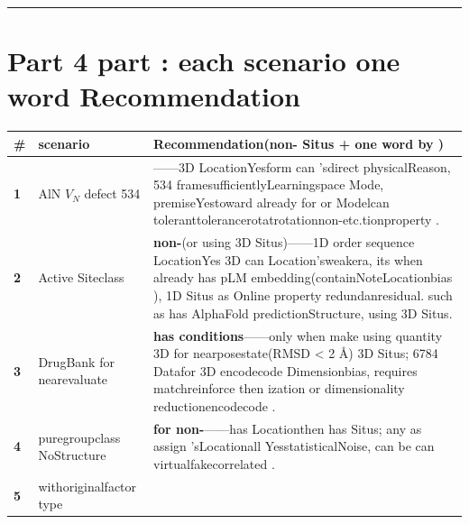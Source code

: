 \documentclass[
  12pt,
]{article}
\begin{document}
\begin{center}\rule{0.5\linewidth}{0.5pt}\end{center}

\section{Part 4
part : each scenario one word Recommendation}\label{ux7b2c-4-ux90e8ux5206ux6bcfux4e2aux573aux666fux4e00ux53e5ux8bddux5efaux8bae}

\begin{longtable}[]{@{}
  >{\raggedright\arraybackslash}p{}
  >{\raggedright\arraybackslash}p{}
  >{\raggedright\arraybackslash}p{}@{}}
\toprule\noalign{}
\begin{minipage}[b]{\linewidth}\raggedright
\#
\end{minipage} & \begin{minipage}[b]{\linewidth}\raggedright
scenario 
\end{minipage} & \begin{minipage}[b]{\linewidth}\raggedright
Recommendation(non- Situs + one word by )
\end{minipage} \\
\midrule\noalign{}
\endhead
\bottomrule\noalign{}
\endlastfoot
\textbf{1} & AlN \(V_N\) defect  534  & \textbf{}------3D
LocationYesform can 'sdirect physicalReason, 534
framesufficientlyLearningspace Mode, premiseYestoward already for or Modelcan toleranttolerancerotatrotationnon-etc.tionproperty .  \\
\textbf{2} & Active Siteclass  & \textbf{non-}(or using  3D Situs)------1D
order sequence LocationYes 3D can Location'sweakera, its when already has  pLM
embedding(containNoteLocationbias ), 1D Situs as Online property redundanresidual. such as has  AlphaFold
predictionStructure, using  3D Situs.  \\
\textbf{3} & DrugBank for nearevaluate & \textbf{has conditions}------only when make using quantity 
3D for nearposestate(RMSD \textless{} 2 Å) 3D Situs; 6784 Datafor  3D
encodecode Dimensionbias, requires matchreinforce then ization or dimensionality reductionencodecode .  \\
\textbf{4} & puregroupclass NoStructure & \textbf{for non-}------has Locationthen has 
Situs; any as assign 'sLocationall YesstatisticalNoise, can be can virtualfakecorrelated .  \\
\textbf{5} & withoriginalfactor type  &

\end{longtable}
\end{document}
